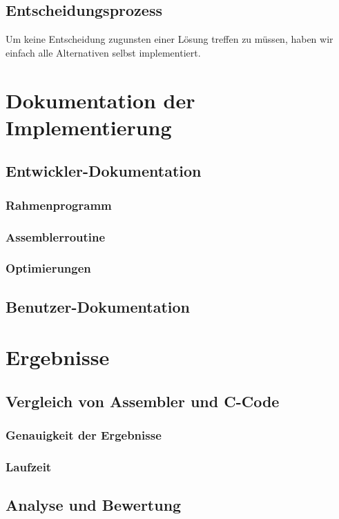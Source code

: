 \documentclass[11pt]{scrartcl}
\begin{document}
\subsection{Entscheidungsprozess}
Um keine Entscheidung zugunsten einer Lösung treffen zu müssen, haben wir einfach alle Alternativen selbst implementiert.
\section{Dokumentation der Implementierung}
\subsection{Entwickler-Dokumentation}
\subsubsection{Rahmenprogramm}
\subsubsection{Assemblerroutine}
\subsubsection{Optimierungen}
\subsection{Benutzer-Dokumentation}

\section{Ergebnisse}
\subsection{Vergleich von Assembler und C-Code}
\subsubsection{Genauigkeit der Ergebnisse}
\subsubsection{Laufzeit}
\subsection{Analyse und Bewertung}
\end{document}
